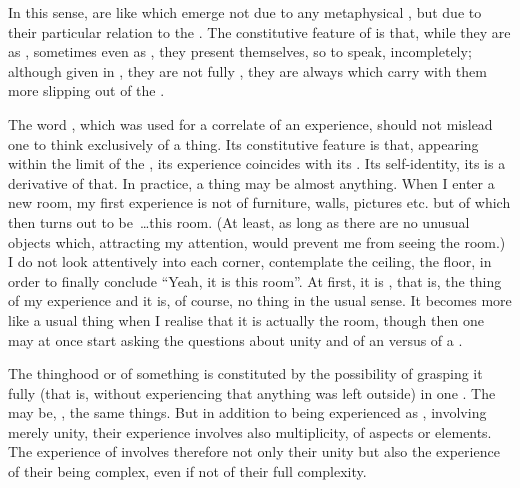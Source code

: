 In this sense,  are like  which emerge not due to any
metaphysical , but due to their particular relation to the
\hoa.  The constitutive feature of  is that, while they are
 as , sometimes even as , they present
themselves, so to speak, incompletely; although given in , they are not fully , they are always  which
carry with them more  slipping out of the \hoa.

\pa The word , which was used for a correlate of an 
experience, should not mislead one to think exclusively of a thing.  Its
constitutive feature is that, appearing within the  limit of the
\hoa, its experience coincides with its . Its self-identity, its
 is a derivative of that.  In practice, a {thing} may be
almost anything. When I enter a new room, my first  experience is
not of furniture, walls, pictures etc. but of  which then turns out to
be~\ldots this room. (At least, as long as there are no unusual objects which,
attracting my attention, would prevent me from seeing the room.) I do not look
attentively into each corner, contemplate the ceiling, the floor, in order to
finally conclude ``Yeah, it is this room''. At first, it is , that is,
the {thing} of my experience and it is, of course, no thing in the usual sense.
It becomes more like a usual thing when I realise that it is actually the room,
though then one may at once start asking the questions about unity and
 of an  versus  of a .

The {thinghood} or  of something is constituted by the
possibility of grasping it fully (that is, without experiencing that anything
was left outside) in one .  The  may be,
, the same things. But in addition to being experienced as
, involving merely unity, their experience involves also
multiplicity,  of aspects or elements.  The experience of
 involves therefore not only their  unity but also
the experience of their being complex, even if not of their full complexity.

